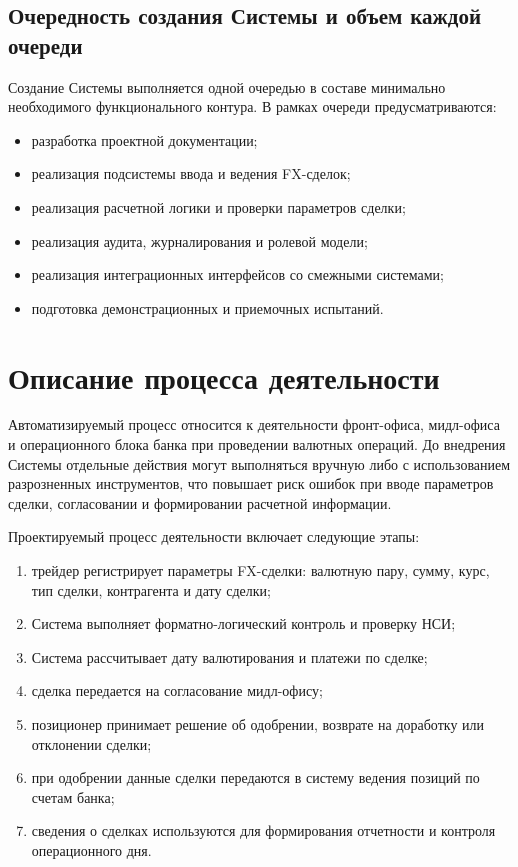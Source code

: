\documentclass[a4paper,14pt]{extarticle}
\begin{document}
\subsection{Очередность создания Системы и объем каждой очереди}
Создание Системы выполняется одной очередью в составе минимально необходимого функционального контура. В рамках очереди предусматриваются:
\begin{itemize}[itemsep=1mm]
  \item разработка проектной документации;
  \item реализация подсистемы ввода и ведения FX-сделок;
  \item реализация расчетной логики и проверки параметров сделки;
  \item реализация аудита, журналирования и ролевой модели;
  \item реализация интеграционных интерфейсов со смежными системами;
  \item подготовка демонстрационных и приемочных испытаний.
\end{itemize}

\section{Описание процесса деятельности}

Автоматизируемый процесс относится к деятельности фронт-офиса, мидл-офиса и операционного блока банка при проведении валютных операций. До внедрения Системы отдельные действия могут выполняться вручную либо с использованием разрозненных инструментов, что повышает риск ошибок при вводе параметров сделки, согласовании и формировании расчетной информации.

Проектируемый процесс деятельности включает следующие этапы:
\begin{enumerate}[label=\arabic*.,itemsep=1mm]
  \item трейдер регистрирует параметры FX-сделки: валютную пару, сумму, курс, тип сделки, контрагента и дату сделки;
  \item Система выполняет форматно-логический контроль и проверку НСИ;
  \item Система рассчитывает дату валютирования и платежи по сделке;
  \item сделка передается на согласование мидл-офису;
  \item позиционер принимает решение об одобрении, возврате на доработку или отклонении сделки;
  \item при одобрении данные сделки передаются в систему ведения позиций по счетам банка;
  \item сведения о сделках используются для формирования отчетности и контроля операционного дня.
\end{enumerate}
\end{document}

